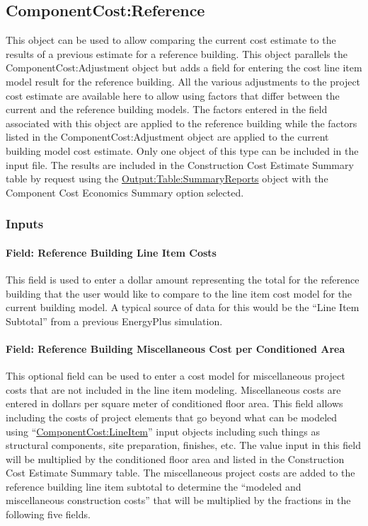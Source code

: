 \subsection{ComponentCost:Reference}\label{componentcostreference}

This object can be used to allow comparing the current cost estimate to the results of a previous estimate for a reference building. This object parallels the ComponentCost:Adjustment object but adds a field for entering the cost line item model result for the reference building. All the various adjustments to the project cost estimate are available here to allow using factors that differ between the current and the reference building models. The factors entered in the field associated with this object are applied to the reference building while the factors listed in the ComponentCost:Adjustment object are applied to the current building model cost estimate. Only one object of this type can be included in the input file. The results are included in the Construction Cost Estimate Summary table by request using the \hyperref[outputtablesummaryreports]{Output:Table:SummaryReports} object with the Component Cost Economics Summary option selected.

\subsubsection{Inputs}\label{inputs-2}

\paragraph{Field: Reference Building Line Item Costs}\label{field-reference-building-line-item-costs}

This field is used to enter a dollar amount representing the total for the reference building that the user would like to compare to the line item cost model for the current building model. A typical source of data for this would be the ``Line Item Subtotal'' from a previous EnergyPlus simulation.

\paragraph{Field: Reference Building Miscellaneous Cost per Conditioned Area}\label{field-reference-building-miscellaneous-cost-per-conditioned-area}

This optional field can be used to enter a cost model for miscellaneous project costs that are not included in the line item modeling. Miscellaneous costs are entered in dollars per square meter of conditioned floor area. This field allows including the costs of project elements that go beyond what can be modeled using ``\hyperref[componentcostlineitem]{ComponentCost:LineItem}'' input objects including such things as structural components, site preparation, finishes, etc. The value input in this field will be multiplied by the conditioned floor area and listed in the Construction Cost Estimate Summary table. The miscellaneous project costs are added to the reference building line item subtotal to determine the ``modeled and miscellaneous construction costs'' that will be multiplied by the fractions in the following five fields.

